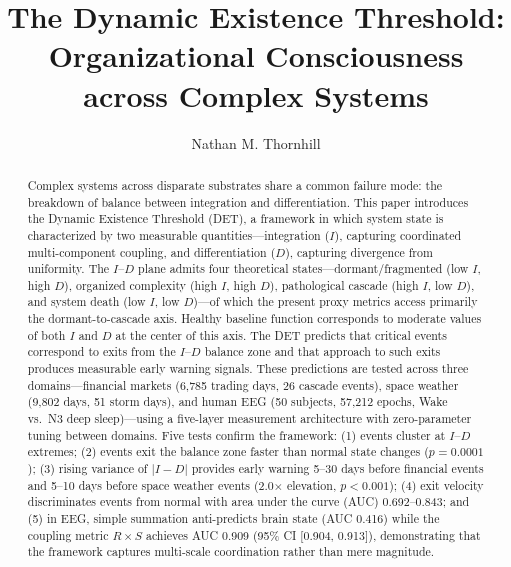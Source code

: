 \documentclass[aip,cha,reprint,amsmath,amssymb,final]{revtex4-2}
\begin{document}
\title{The Dynamic Existence Threshold: Organizational Consciousness across Complex Systems}
\author{Nathan M. Thornhill}

\begin{abstract}
Complex systems across disparate substrates share a common failure mode: the breakdown of balance between integration and differentiation. This paper introduces the Dynamic Existence Threshold (DET), a framework in which system state is characterized by two measurable quantities---integration ($I$), capturing coordinated multi-component coupling, and differentiation ($D$), capturing divergence from uniformity. The $I$--$D$ plane admits four theoretical states---dormant/fragmented (low $I$, high $D$), organized complexity (high $I$, high $D$), pathological cascade (high $I$, low $D$), and system death (low $I$, low $D$)---of which the present proxy metrics access primarily the dormant-to-cascade axis. Healthy baseline function corresponds to moderate values of both $I$ and $D$ at the center of this axis. The DET predicts that critical events correspond to exits from the $I$--$D$ balance zone and that approach to such exits produces measurable early warning signals. These predictions are tested across three domains---financial markets (6,785 trading days, 26 cascade events), space weather (9,802 days, 51 storm days), and human EEG (50 subjects, 57,212 epochs, Wake vs.\ N3 deep sleep)---using a five-layer measurement architecture with zero-parameter tuning between domains. Five tests confirm the framework: (1) events cluster at $I$--$D$ extremes; (2) events exit the balance zone faster than normal state changes ($p = 0.0001$); (3) rising variance of $|I - D|$ provides early warning 5--30 days before financial events and 5--10 days before space weather events (2.0$\times$ elevation, $p < 0.001$); (4) exit velocity discriminates events from normal with area under the curve (AUC) 0.692--0.843; and (5) in EEG, simple summation anti-predicts brain state (AUC 0.416) while the coupling metric $R \times S$ achieves AUC 0.909 (95\% CI [0.904, 0.913]), demonstrating that the framework captures multi-scale coordination rather than mere magnitude.
\end{abstract}
\maketitle
\end{document}
